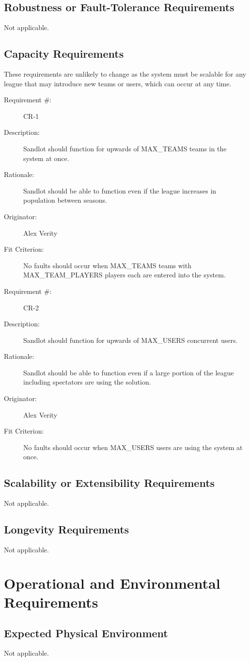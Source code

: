 \documentclass[12pt]{article}
\newenvironment{myreq}[1]{%
\setlist[description]{font=\normalfont\color{darkgray}}%
\begin{tcolorbox}[colframe=black,colback=white, sharp corners, boxrule=1pt]%
\bfseries\color{blue}%
\begin{description}#1}%
{\end{description}\end{tcolorbox}}
\newcommand{\twoinline}[2]{\begin{multicols}{2}#1 #2\end{multicols}}
\newcommand{\reqno}{\item[Requirement \#:]}
\newcommand{\reqdesc}{\item[Description:]}
\newcommand{\reqrat}{\item[Rationale:]}
\newcommand{\reqorig}{\item[Originator:]}
\newcommand{\reqfit}{\item[Fit Criterion:]}
\newcommand{\reqsatis}{\item[Customer Satisfaction:]}
\newcommand{\reqdissat}{\item[Customer Dissatisfaction:]}
\begin{document}
\subsection{Robustness or Fault-Tolerance Requirements}

Not applicable.

\subsection{Capacity Requirements}

These requirements are unlikely to change as the system must be scalable for
any league that may introduce new teams or users, which can occur at any time.

\begin{myreq}
  \reqno CR-1
  \reqdesc Sandlot should function for upwards of MAX\_TEAMS teams in the
  system at once.
  \reqrat Sandlot should be able to function even if the league increases in
  population between seasons.
  \reqorig Alex Verity
  \reqfit No faults should occur when MAX\_TEAMS teams with MAX\_TEAM\_PLAYERS
  players each are entered into the system.
  \twoinline
    {\reqsatis 2}
    {\reqdissat 2}
\end{myreq}

\begin{myreq}
  \reqno CR-2
  \reqdesc Sandlot should function for upwards of MAX\_USERS concurrent users.
  \reqrat Sandlot should be able to function even if a large portion of the
  league including spectators are using the solution.
  \reqorig Alex Verity
  \reqfit No faults should occur when MAX\_USERS users are using the system at
  once.
  \twoinline
    {\reqsatis 3}
    {\reqdissat 3}
\end{myreq}

\subsection{Scalability or Extensibility Requirements}
Not applicable.
\subsection{Longevity Requirements}
Not applicable.

\section{Operational and Environmental Requirements}
\subsection{Expected Physical Environment}
Not applicable.
\end{document}
